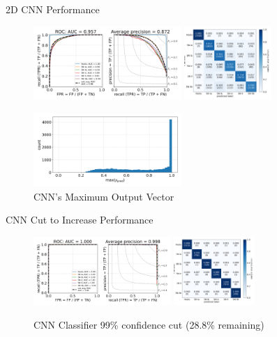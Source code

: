 \begin{frame}{2D CNN Performance}
    \begin{figure}
        \centering
        \includegraphics[height=2.8cm]{figures/cnn/cnn_rocfull.png}
        \quad
        \includegraphics[height=2.8cm]{figures/cnn/cnn_cmfull.png}
        \caption{CNN Classifier}

        \includegraphics[width=0.5\textwidth]{figures/cnn/cnn_max_ypred.png}
        \caption{CNN's Maximum Output Vector\label{fig:cnn_max}}
    \end{figure}
\end{frame}

\begin{frame}{CNN Cut to Increase Performance}
    \begin{figure}[b]
        \centering
        \includegraphics[height=2.6cm]{figures/cnn/cnn_roc99.png}
        \quad
        \includegraphics[height=2.6cm]{figures/cnn/cnn_cm99.png}
        \caption{CNN Classifier 99\% confidence cut (28.8\% remaining)}
    \end{figure}
\end{frame}


